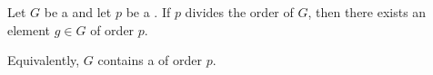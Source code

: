 \begin{theorem} \label{theorem:cauchys_theorem_that_a_fintie_group_contains_an_element_of_prime_factor_order_of_cardinality}
Let $G$ be a   and let $p$ be a . 
If $p$ divides the order of $G$, then there exists an element $g \in G$ of order $p$.

Equivalently, $G$ contains a  of order $p$.
\end{theorem}